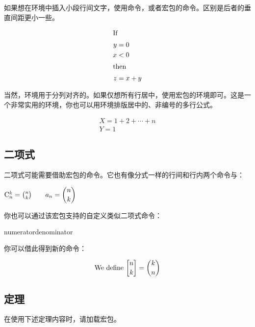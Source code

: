 如果想在环境中插入小段行间文字，使用命令，或者宏包的命令。区别是后者的垂直间距更小一些。

\begin{codeshow}
\begin{align*}
\shortintertext{If}
 y &= 0 \\
 x &< 0\\
\shortintertext{then}
 z &= x+y
\end{align*}
\end{codeshow}

当然，环境用于分列对齐的。如果仅想所有行居中，使用宏包的环境即可。这是一个非常实用的环境，你也可以用环境排版居中的、非编号的多行公式。

\begin{codeshow}
\begin{gather}
  X=1+2+\cdots+n \\
  Y=1
\end{gather}
\end{codeshow}

\subsection{二项式}
\label{subsec:binom}
二项式可能需要借助宏包的命令。它也有像分式一样的行间和行内两个命令与：

\begin{codeshow}
$\mathrm{C}_n^k=\binom{n}{k}
\qquad a_n=\dbinom{n}{k}$
\end{codeshow}

你也可以通过该宏包支持的自定义类似二项式命令：
\begin{latex}
{numerator}{denominator}
\newcommand{\Bfrac}[2]{\genfrac{[}{]}{0pt}{}{#1}{#2}}
\end{latex}

你可以借此得到新的命令：
\begin{codeshow}
\[\text{We define } \Bfrac{n}{k} = \binom{k}{n}\]
\end{codeshow}

\subsection{定理}
在使用下述定理内容时，请加载宏包。

